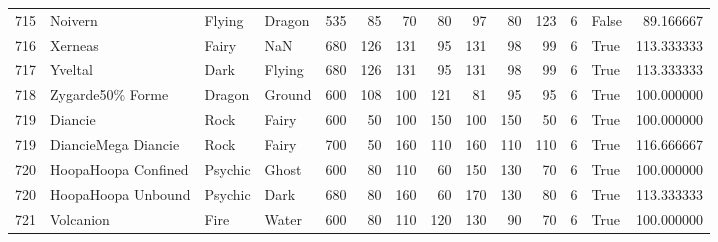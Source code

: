 \begin{tabular}{rlllrrrrrrrrlr}
 715 &                    Noivern &    Flying &    Dragon &    535 &   85 &      70 &       80 &       97 &       80 &    123 &           6 &      False &   89.166667 \\
 716 &                    Xerneas &     Fairy &       NaN &    680 &  126 &     131 &       95 &      131 &       98 &     99 &           6 &       True &  113.333333 \\
 717 &                    Yveltal &      Dark &    Flying &    680 &  126 &     131 &       95 &      131 &       98 &     99 &           6 &       True &  113.333333 \\
 718 &           Zygarde50\% Forme &    Dragon &    Ground &    600 &  108 &     100 &      121 &       81 &       95 &     95 &           6 &       True &  100.000000 \\
 719 &                    Diancie &      Rock &     Fairy &    600 &   50 &     100 &      150 &      100 &      150 &     50 &           6 &       True &  100.000000 \\
 719 &        DiancieMega Diancie &      Rock &     Fairy &    700 &   50 &     160 &      110 &      160 &      110 &    110 &           6 &       True &  116.666667 \\
 720 &        HoopaHoopa Confined &   Psychic &     Ghost &    600 &   80 &     110 &       60 &      150 &      130 &     70 &           6 &       True &  100.000000 \\
 720 &         HoopaHoopa Unbound &   Psychic &      Dark &    680 &   80 &     160 &       60 &      170 &      130 &     80 &           6 &       True &  113.333333 \\
 721 &                  Volcanion &      Fire &     Water &    600 &   80 &     110 &      120 &      130 &       90 &     70 &           6 &       True &  100.000000 \\
\bottomrule
\end{tabular}
